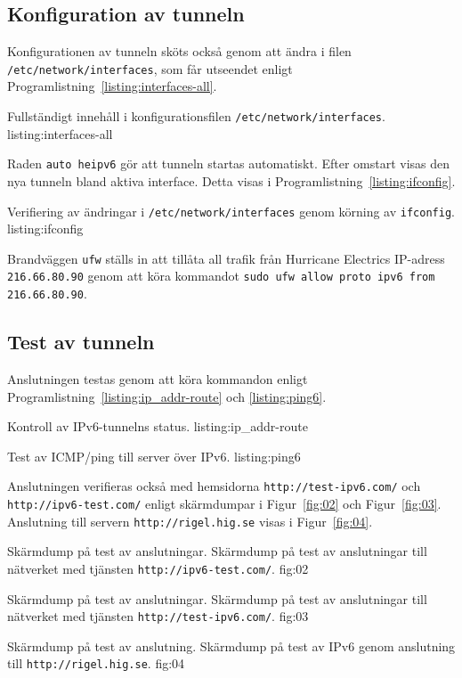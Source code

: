 \subsection{Konfiguration av tunneln}
Konfigurationen av tunneln sköts också genom att ändra i filen
\texttt{/etc/network/interfaces}, som får utseendet enligt
Programlistning~\ref{listing:interfaces-all}.

						 {Fullständigt innehåll i konfigurationsfilen
							\texttt{/etc/network/interfaces}.}
             {listing:interfaces-all}


Raden \texttt{auto heipv6} gör att tunneln startas automatiskt.
Efter omstart visas den nya tunneln bland aktiva interface. Detta visas i  
Programlistning~\ref{listing:ifconfig}.

            {Verifiering av ändringar i \texttt{/etc/network/interfaces}
             genom körning av \texttt{ifconfig}.}
            {listing:ifconfig}

Brandväggen \texttt{ufw} ställs in att tillåta all trafik från Hurricane
Electrics IP-adress \texttt{216.66.80.90} genom att köra kommandot \texttt{sudo
ufw allow proto ipv6 from 216.66.80.90}.

\subsection{Test av tunneln}
Anslutningen testas genom att köra kommandon enligt 
Programlistning~\ref{listing:ip_addr-route} och \ref{listing:ping6}.

            {Kontroll av IPv6-tunnelns status.}
            {listing:ip_addr-route}

            {Test av ICMP/ping till server över IPv6.}
            {listing:ping6}

Anslutningen verifieras också med hemsidorna \texttt{http://test-ipv6.com/} och
\texttt{http://ipv6-test.com/} enligt skärmdumpar i Figur~\ref{fig:02} och
Figur~\ref{fig:03}.
Anslutning till servern \texttt{http://rigel.hig.se} visas i
Figur~\ref{fig:04}.

           {Skärmdump på test av anslutningar.}
					 {Skärmdump på test av anslutningar till nätverket med tjänsten
						\texttt{http://ipv6-test.com/}.}
           {fig:02}

           {Skärmdump på test av anslutningar.}
           {Skärmdump på test av anslutningar till nätverket med tjänsten
            \texttt{http://test-ipv6.com/}.}
           {fig:03}

           {Skärmdump på test av anslutning.}
					 {Skärmdump på test av IPv6 genom anslutning till
						\texttt{http://rigel.hig.se}.}
           {fig:04}


